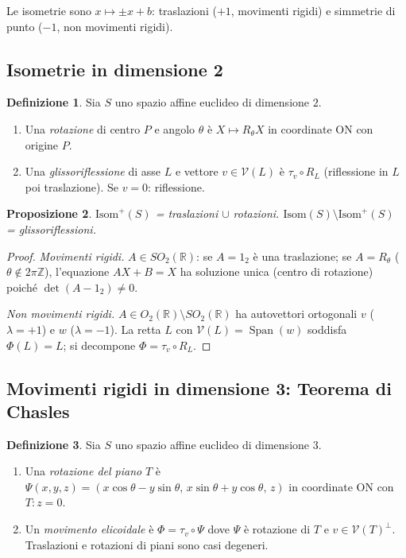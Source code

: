 \documentclass[11pt, a4paper]{book}
\theoremstyle{definition}
\newtheorem{definizione}{Definizione}[section]
\theoremstyle{plain}
\newtheorem{proposizione}[definizione]{Proposizione}
\theoremstyle{remark}
\newcommand{\Z}{\mathbb{Z}}
\newcommand{\R}{\mathbb{R}}
\DeclareMathOperator{\Span}{Span}
\begin{document}
Le isometrie sono $x \mapsto \pm x + b$: traslazioni ($+1$, movimenti rigidi) e simmetrie di punto ($-1$, non movimenti rigidi).

\subsection{Isometrie in dimensione 2}

\begin{defbox}
\begin{definizione}
Sia $S$ uno spazio affine euclideo di dimensione $2$.
\begin{enumerate}
  \item Una \emph{rotazione} di centro $P$ e angolo $\theta$ è $X \mapsto R_\theta X$ in coordinate ON con origine $P$.
  \item Una \emph{glissoriflessione} di asse $L$ e vettore $v \in \mathcal{V}(L)$ è $\tau_v \circ R_L$ (riflessione in $L$ poi traslazione). Se $v=0$: riflessione.
\end{enumerate}
\end{definizione}
\end{defbox}

\begin{proposizione}
\label{prop:isom-dim2}
$\mathrm{Isom}^+(S)$ = traslazioni $\cup$ rotazioni. $\mathrm{Isom}(S)\setminus\mathrm{Isom}^+(S)$ = glissoriflessioni.
\end{proposizione}

\begin{proof}
\emph{Movimenti rigidi.} $A \in SO_2(\R)$: se $A=1_2$ è una traslazione; se $A=R_\theta$ ($\theta \notin 2\pi\Z$), l'equazione $AX+B=X$ ha soluzione unica (centro di rotazione) poiché $\det(A-1_2)\neq 0$.

\emph{Non movimenti rigidi.} $A \in O_2(\R)\setminus SO_2(\R)$ ha autovettori ortogonali $v$ ($\lambda=+1$) e $w$ ($\lambda=-1$). La retta $L$ con $\mathcal{V}(L)=\Span(w)$ soddisfa $\Phi(L)=L$; si decompone $\Phi=\tau_v\circ R_L$.
\end{proof}

\subsection{Movimenti rigidi in dimensione 3: Teorema di Chasles}

\begin{defbox}
\begin{definizione}
Sia $S$ uno spazio affine euclideo di dimensione $3$.
\begin{enumerate}
  \item Una \emph{rotazione del piano} $T$ è $\Psi(x,y,z) = (x\cos\theta-y\sin\theta,\, x\sin\theta+y\cos\theta,\, z)$ in coordinate ON con $T: z=0$.
  \item Un \emph{movimento elicoidale} è $\Phi = \tau_v \circ \Psi$ dove $\Psi$ è rotazione di $T$ e $v \in \mathcal{V}(T)^\perp$. Traslazioni e rotazioni di piani sono casi degeneri.
\end{enumerate}
\end{definizione}
\end{defbox}
\end{document}
